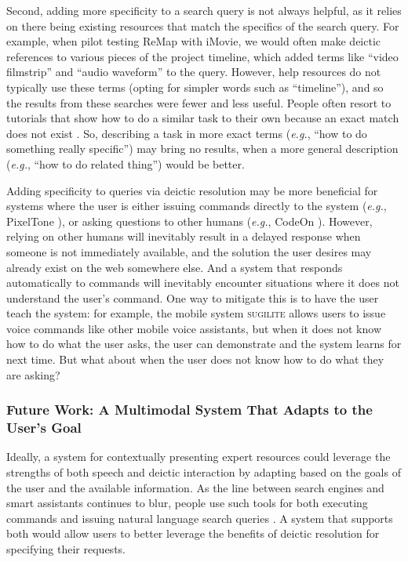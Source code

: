 Second, adding more specificity to a search query is not always helpful, as it relies on there being existing resources that match the specifics of the search query. For example, when pilot testing ReMap with iMovie, we would often make deictic references to various pieces of the project timeline, which added terms like ``video filmstrip'' and ``audio waveform'' to the query. However, help resources do not typically use these terms (opting for simpler words such as ``timeline''), and so the results from these searches were fewer and less useful. People often resort to tutorials that show how to do a similar task to their own because an exact match does not exist \cite{Lafreniere2014a}. So, describing a task in more exact terms (\textit{e.g.}, ``how to do something really specific'') may bring no results, when a more general description (\textit{e.g.}, ``how to do related thing'') would be better.

Adding specificity to queries via deictic resolution may be more beneficial for systems where the user is either issuing commands directly to the system (\textit{e.g.}, PixelTone \cite{Laput2013}), or asking questions to other humans (\textit{e.g.}, CodeOn \cite{Chen2017}). However, relying on other humans will inevitably result in a delayed response when someone is not immediately available, and the solution the user desires may already exist on the web somewhere else. And a system that responds automatically to commands will inevitably encounter situations where it does not understand the user's command. One way to mitigate this is to have the user teach the system: for example, the mobile system \textsc{sugilite} \cite{Li2017} allows users to issue voice commands like other mobile voice assistants, but when it does not know how to do what the user asks, the user can demonstrate and the system learns for next time. But what about when the user does not know how to do what they are asking?

\subsubsection{Future Work: A Multimodal System That Adapts to the User's Goal}
Ideally, a system for contextually presenting expert resources could leverage the strengths of both speech and deictic interaction by adapting based on the goals of the user and the available information. As the line between search engines and smart assistants continues to blur, people use such tools for both executing commands and issuing natural language search queries \cite{Bota2018, Adar2014, Fourney2016, Norman2007}. A system that supports both would allow users to better leverage the benefits of deictic resolution for specifying their requests. 


